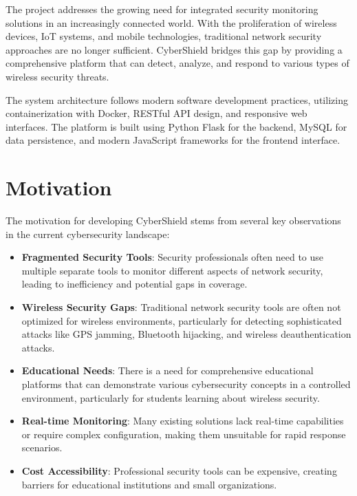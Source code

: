 \documentclass[12pt,a4paper]{report}
\begin{document}
The project addresses the growing need for integrated security monitoring solutions in an increasingly connected world. With the proliferation of wireless devices, IoT systems, and mobile technologies, traditional network security approaches are no longer sufficient. CyberShield bridges this gap by providing a comprehensive platform that can detect, analyze, and respond to various types of wireless security threats.

The system architecture follows modern software development practices, utilizing containerization with Docker, RESTful API design, and responsive web interfaces. The platform is built using Python Flask for the backend, MySQL for data persistence, and modern JavaScript frameworks for the frontend interface.

\section{Motivation}

The motivation for developing CyberShield stems from several key observations in the current cybersecurity landscape:

\begin{itemize}
    \item \textbf{Fragmented Security Tools}: Security professionals often need to use multiple separate tools to monitor different aspects of network security, leading to inefficiency and potential gaps in coverage.
    
    \item \textbf{Wireless Security Gaps}: Traditional network security tools are often not optimized for wireless environments, particularly for detecting sophisticated attacks like GPS jamming, Bluetooth hijacking, and wireless deauthentication attacks.
    
    \item \textbf{Educational Needs}: There is a need for comprehensive educational platforms that can demonstrate various cybersecurity concepts in a controlled environment, particularly for students learning about wireless security.
    
    \item \textbf{Real-time Monitoring}: Many existing solutions lack real-time capabilities or require complex configuration, making them unsuitable for rapid response scenarios.
    
    \item \textbf{Cost Accessibility}: Professional security tools can be expensive, creating barriers for educational institutions and small organizations.
\end{itemize}
\end{document}
